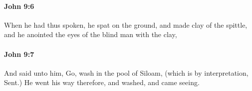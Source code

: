 		\paragraph{John 9:6} %
			\label{JOHN-9-6}

			When he had thus spoken, he spat on the ground, and made clay of the spittle, and he anointed the eyes of the blind man with the clay,

			\begin{framed}
			\scriptsize
				\begin{compactdesc}
					\item[SBLG] 
				\end{compactdesc}
			\end{framed}

		\paragraph{John 9:7} %
			\label{JOHN-9-7}

			And said unto him, Go, wash in the pool of Siloam, (which is by interpretation, Sent.) He went his way therefore, and washed, and came seeing.

